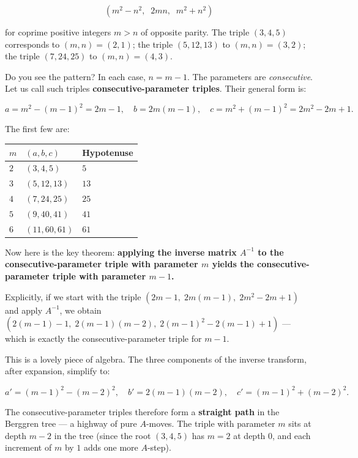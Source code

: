 \[(m^2 - n^2,\;\; 2mn,\;\; m^2 + n^2)\]

for coprime positive integers \(m > n\) of opposite parity. The triple \((3, 4, 5)\) corresponds to \((m, n) = (2, 1)\); the triple \((5, 12, 13)\) to \((m, n) = (3, 2)\); the triple \((7, 24, 25)\) to \((m, n) = (4, 3)\).

Do you see the pattern? In each case, \(n = m - 1\). The parameters are \emph{consecutive}. Let us call such triples \textbf{consecutive-parameter triples}. Their general form is:

\[a = m^2 - (m-1)^2 = 2m - 1, \quad b = 2m(m-1), \quad c = m^2 + (m-1)^2 = 2m^2 - 2m + 1.\]

The first few are:

\begin{longtable}[]{@{}lll@{}}
\toprule\noalign{}
\(m\) & \((a, b, c)\) & Hypotenuse \\
\midrule\noalign{}
\endhead
\bottomrule\noalign{}
\endlastfoot
\(2\) & \((3, 4, 5)\) & \(5\) \\
\(3\) & \((5, 12, 13)\) & \(13\) \\
\(4\) & \((7, 24, 25)\) & \(25\) \\
\(5\) & \((9, 40, 41)\) & \(41\) \\
\(6\) & \((11, 60, 61)\) & \(61\) \\
\end{longtable}

Now here is the key theorem: \textbf{applying the inverse matrix \(A^{-1}\) to the consecutive-parameter triple with parameter \(m\) yields the consecutive-parameter triple with parameter \(m - 1\).}

Explicitly, if we start with the triple \((2m - 1,\; 2m(m-1),\; 2m^2 - 2m + 1)\) and apply \(A^{-1}\), we obtain \((2(m-1) - 1,\; 2(m-1)(m-2),\; 2(m-1)^2 - 2(m-1) + 1)\) --- which is exactly the consecutive-parameter triple for \(m - 1\).

This is a lovely piece of algebra. The three components of the inverse transform, after expansion, simplify to:

\[a' = (m-1)^2 - (m-2)^2, \quad b' = 2(m-1)(m-2), \quad c' = (m-1)^2 + (m-2)^2.\]

The consecutive-parameter triples therefore form a \textbf{straight path} in the Berggren tree --- a highway of pure \(A\)-moves. The triple with parameter \(m\) sits at depth \(m - 2\) in the tree (since the root \((3, 4, 5)\) has \(m = 2\) at depth \(0\), and each increment of \(m\) by \(1\) adds one more \(A\)-step).


